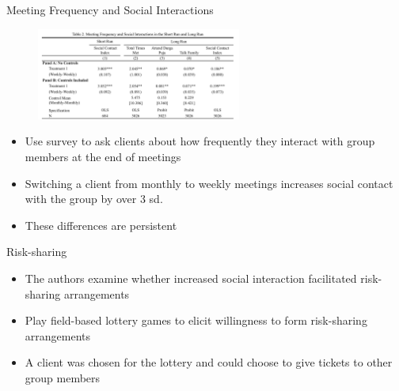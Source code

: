 \documentclass[11pt,notes=hide,aspectratio=169,mathserif]{beamer}
\begin{document}
\begin{frame}{Meeting Frequency and Social Interactions}
\begin{figure}
    \centering
    \includegraphics[width=0.6\textwidth]{inputs/Fig2.png}
\end{figure}
\begin{itemize}
    \item Use survey to ask clients about how frequently they interact with group members at the end of meetings 
    \item Switching a client from monthly to weekly meetings increases social contact with the group by over 3 sd. 
    \item These differences are persistent 
\end{itemize}
\end{frame}

\begin{frame}{Risk-sharing}
\begin{itemize}
    \item The authors examine whether increased social interaction facilitated risk-sharing arrangements 
    \item Play field-based lottery games to elicit willingness to form risk-sharing arrangements
    \item A client was chosen for the lottery and could choose to give tickets to other group members
\end{itemize}
\end{frame}
\end{document}
